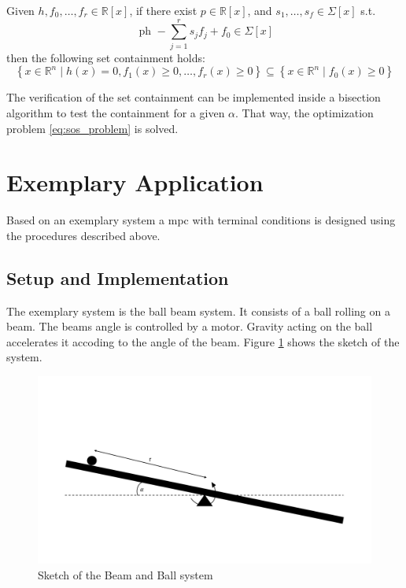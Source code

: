 \documentclass[10pt,a4paper,titlepage]{article}
\begin{document}
\begin{tcolorbox}[colback=gray!20, colframe=gray!80,title=Generalized S-procedure \cite{loureiro2023presentation},arc=0.2mm]        
Given $h, f_0, \ldots, f_r \in \mathbb{R}[x]$, if there exist $p \in \mathbb{R}[x]$, and $s_1, \ldots, s_f \in \Sigma[x]$ s.t.
\begin{equation}
	\text { ph }-\sum_{j=1}^r s_j f_j+f_0 \in \Sigma[x]
\end{equation}
then the following set containment holds:
\begin{equation}
	\left\{x \in \mathbb{R}^n \mid h(x)=0, f_1(x) \geq 0, \ldots, f_r(x) \geq 0\right\} \subseteq\left\{x \in \mathbb{R}^n \mid f_0(x) \geq 0\right\}
\end{equation}
\end{tcolorbox}

The verification of the set containment can be implemented inside a bisection algorithm to test the containment for a given $\alpha$. That way, the optimization problem \eqref{eq:sos_problem}
is solved.









\section{Exemplary Application}
\label{sec:example}

Based on an exemplary system a \gls{mpc} with terminal conditions is designed using the procedures described above. 


\subsection{Setup and Implementation}
The exemplary system is the ball beam system.
It consists of a ball rolling on a beam. The beams angle is controlled by a motor. Gravity acting on the ball accelerates it accoding to the angle of the beam.
Figure \ref{pic:sketch} shows the sketch of the system. 

\begin{figure}[h]
	\begin{center}
		\includegraphics[width=\textwidth]{img/beamBallSketch2.pdf}
		\caption{Sketch of the Beam and Ball system}
		\label{pic:sketch}
	\end{center}
\end{figure}
\end{document}
